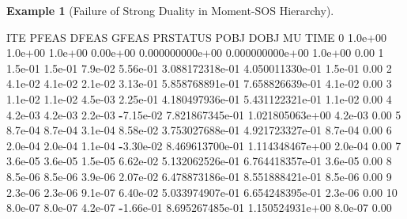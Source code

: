 \documentclass[
]{book}
\newenvironment{Shaded}{\begin{snugshade}}{\end{snugshade}}
\newcommand{\FloatTok}[1]{\textcolor[rgb]{0.00,0.00,0.81}{#1}}
\newcommand{\OperatorTok}[1]{\textcolor[rgb]{0.81,0.36,0.00}{\textbf{#1}}}
\newcommand{\VariableTok}[1]{\textcolor[rgb]{0.00,0.00,0.00}{#1}}
\theoremstyle{definition}
\theoremstyle{definition}
\newtheorem{example}{Example}[chapter]
\theoremstyle{definition}
\theoremstyle{definition}
\theoremstyle{remark}
\begin{document}
\begin{example}[Failure of Strong Duality in Moment-SOS Hierarchy]
\begin{Shaded}
\begin{Highlighting}[]
\VariableTok{ITE} \VariableTok{PFEAS}    \VariableTok{DFEAS}    \VariableTok{GFEAS}    \VariableTok{PRSTATUS}   \VariableTok{POBJ}              \VariableTok{DOBJ}              \VariableTok{MU}       \VariableTok{TIME}  
\FloatTok{0}   \FloatTok{1.0e+00}  \FloatTok{1.0e+00}  \FloatTok{1.0e+00}  \FloatTok{0.00e+00}   \FloatTok{0.000000000e+00}   \FloatTok{0.000000000e+00}   \FloatTok{1.0e+00}  \FloatTok{0.00}  
\FloatTok{1}   \FloatTok{1.5e{-}01}  \FloatTok{1.5e{-}01}  \FloatTok{7.9e{-}02}  \FloatTok{5.56e{-}01}   \FloatTok{3.088172318e{-}01}   \FloatTok{4.050011330e{-}01}   \FloatTok{1.5e{-}01}  \FloatTok{0.00}  
\FloatTok{2}   \FloatTok{4.1e{-}02}  \FloatTok{4.1e{-}02}  \FloatTok{2.1e{-}02}  \FloatTok{3.13e{-}01}   \FloatTok{5.858768891e{-}01}   \FloatTok{7.658826639e{-}01}   \FloatTok{4.1e{-}02}  \FloatTok{0.00}  
\FloatTok{3}   \FloatTok{1.1e{-}02}  \FloatTok{1.1e{-}02}  \FloatTok{4.5e{-}03}  \FloatTok{2.25e{-}01}   \FloatTok{4.180497936e{-}01}   \FloatTok{5.431122321e{-}01}   \FloatTok{1.1e{-}02}  \FloatTok{0.00}  
\FloatTok{4}   \FloatTok{4.2e{-}03}  \FloatTok{4.2e{-}03}  \FloatTok{2.2e{-}03}  \OperatorTok{{-}}\FloatTok{7.15e{-}02}  \FloatTok{7.821867345e{-}01}   \FloatTok{1.021805063e+00}   \FloatTok{4.2e{-}03}  \FloatTok{0.00}  
\FloatTok{5}   \FloatTok{8.7e{-}04}  \FloatTok{8.7e{-}04}  \FloatTok{3.1e{-}04}  \FloatTok{8.58e{-}02}   \FloatTok{3.753027688e{-}01}   \FloatTok{4.921723327e{-}01}   \FloatTok{8.7e{-}04}  \FloatTok{0.00}  
\FloatTok{6}   \FloatTok{2.0e{-}04}  \FloatTok{2.0e{-}04}  \FloatTok{1.1e{-}04}  \OperatorTok{{-}}\FloatTok{3.30e{-}02}  \FloatTok{8.469613700e{-}01}   \FloatTok{1.114348467e+00}   \FloatTok{2.0e{-}04}  \FloatTok{0.00}  
\FloatTok{7}   \FloatTok{3.6e{-}05}  \FloatTok{3.6e{-}05}  \FloatTok{1.5e{-}05}  \FloatTok{6.62e{-}02}   \FloatTok{5.132062526e{-}01}   \FloatTok{6.764418357e{-}01}   \FloatTok{3.6e{-}05}  \FloatTok{0.00}  
\FloatTok{8}   \FloatTok{8.5e{-}06}  \FloatTok{8.5e{-}06}  \FloatTok{3.9e{-}06}  \FloatTok{2.07e{-}02}   \FloatTok{6.478873186e{-}01}   \FloatTok{8.551888421e{-}01}   \FloatTok{8.5e{-}06}  \FloatTok{0.00}  
\FloatTok{9}   \FloatTok{2.3e{-}06}  \FloatTok{2.3e{-}06}  \FloatTok{9.1e{-}07}  \FloatTok{6.40e{-}02}   \FloatTok{5.033974907e{-}01}   \FloatTok{6.654248395e{-}01}   \FloatTok{2.3e{-}06}  \FloatTok{0.00}  
\FloatTok{10}  \FloatTok{8.0e{-}07}  \FloatTok{8.0e{-}07}  \FloatTok{4.2e{-}07}  \OperatorTok{{-}}\FloatTok{1.66e{-}01}  \FloatTok{8.695267485e{-}01}   \FloatTok{1.150524931e+00}   \FloatTok{8.0e{-}07}  \FloatTok{0.00}  

\end{Highlighting}
\end{Shaded}
\end{example}
\end{document}
